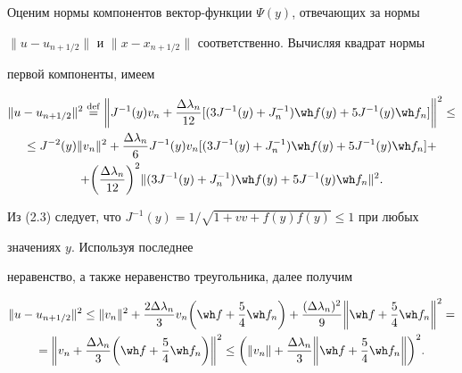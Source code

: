 \begin{pf} 


Оценим нормы компонентов вектор-функции $\Psi(y)$, отвечающих за нормы 


$\|u-u_{n+1/2}\|$ и $\|x-x_{n+1/2}\|$ соответственно. Вычисляя квадрат нормы 


первой компоненты, имеем 


\begin{multline*} 


\|u-u_{n+1/2}\|^2\overset{\mathrm{def}}{=}{}\bigg\|J^{-1}(y)v_n+ 


\frac{\Delta\lambda_n}{12}[(3J^{-1}(y)+J^{-1}_n)\wh f(y)+5J^{-1} 


(y)\wh f_n]\bigg\|^2 \le \\ 


% 


\le J^{-2}(y)\|v_n\|^2+\frac{\Delta\lambda_n}{6}J^{-1}(y)v_n 


[(3J^{-1}(y)+J^{-1}_n)\wh f(y)+5J^{-1}(y)\wh f_n]+ \\ 


% 


+\bigg(\frac{\Delta\lambda_n}{12} \bigg)^2 


\|(3J^{-1}(y)+J^{-1}_n)\wh f(y)+5J^{-1}(y)\wh f_n\|^2. 


\end{multline*} 


 


Из (2.3) следует, что $J^{-1}(y)= 1/\sqrt{1+vv+f(y)f(y)}\le1$ при любых 


значениях $y$. Используя последнее 


неравенство, а также неравенство треугольника, далее получим 


\begin{multline*} 


\|u-u_{n+1/2}\|^2\le\|v_n\|^2+\frac{2\Delta\lambda_n}{3}v_n\bigg(\wh f+ 


\frac{5}{4}\wh f_n\bigg)+\frac{(\Delta\lambda_n)^2}{9}\bigg\| 


\wh f+\frac{5}{4}\wh f_n\bigg\|^2= \\ 


% 


=\bigg\|v_n+\frac{\Delta\lambda_n}{3}\bigg(\wh f+ 


\frac{5}{4}\wh f_n\bigg)\bigg\|^2\le\bigg(\|v_n\|+ 


\frac{\Delta\lambda_n}{3}\bigg\|\wh f+\frac{5}{4}\wh f_n 


\bigg\|\bigg)^2. 



\end{multline*}
\end{pf}
